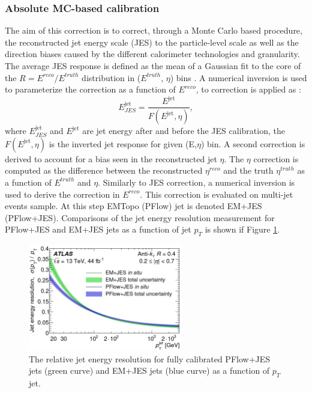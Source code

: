 \subsubsection{Absolute MC-based calibration}
\label{Jet:Cal:chain:JES}
The aim of this correction is to correct, through a Monte Carlo based procedure, the reconstructed jet energy scale (JES) to the particle-level scale as well as the direction biases caused by the different calorimeter technologies and granularity. The average JES response is defined as the mean of a Gaussian fit to the core of the $R=E^{reco}/E^{truth}$ distribution in ($E^{truth}$, $\eta$) bins \cite{Old_JES, Old_JES_Sys}. A numerical inversion is used to parameterize the correction as a function of $E^{reco}$, to correction is applied as : 
\begin{equation}
    E_{JES}^{\mathrm{jet}}=\frac{E^{\mathrm{jet}}}{F(E^{\mathrm{jet}},\eta)},
\end{equation}
where $E_{JES}^{\mathrm{jet}}$ and $E^{\mathrm{jet}}$ are jet energy after and before the JES calibration, the $F(E^{\mathrm{jet}},\eta)$ is the inverted jet response for given (E,$\eta$) bin. A second correction is derived to account for a bias seen in the reconstructed jet $\eta$. The $\eta$ correction is computed as the difference between the reconstructed $\eta^{reco}$ and the truth $\eta^{truth}$ as a function of $E^{truth}$ and $\eta$. Similarly to JES correction, a numerical inversion is used to derive the correction in $E^{reco}$. This correction is evaluated on multi-jet events sample. At this step EMTopo (PFlow) jet is denoted EM+JES (PFlow+JES). Comparisons of the jet energy resolution measurement for PFlow+JES and EM+JES jets as a function of jet $p_T$ is shown if Figure \ref{fig:Jet:Cal:chain:JER}.
\begin{figure}[htbp]
    \centering
    \includegraphics[width=0.6\textwidth]{Ch4/Img/Jet_Resolution_Topo_vs_PFlow.png}
    \caption{The relative jet energy resolution for fully calibrated PFlow+JES jets (green curve) and EM+JES jets (blue curve) as a function of $p_T$ jet.}
    \label{fig:Jet:Cal:chain:JER}
\end{figure}
